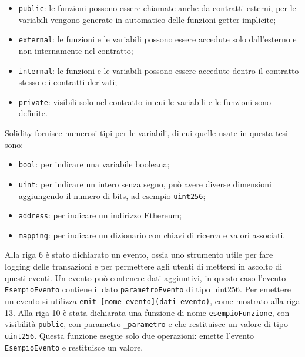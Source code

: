 \documentclass[a4paper]{article}
\begin{document}
      \begin{itemize}
        \item \verb|public|: le funzioni possono essere chiamate anche da contratti esterni, per le variabili vengono generate in automatico delle funzioni getter implicite;
        \item \verb|external|: le funzioni e le variabili possono essere accedute solo dall'esterno e non internamente nel contratto;
        \item \verb|internal|: le funzioni e le variabili possono essere accedute dentro il contratto stesso e i contratti derivati;
        \item \verb|private|: visibili solo nel contratto in cui le variabili e le funzioni sono definite\cite{solidityvisibility}.
      \end{itemize}
      Solidity fornisce numerosi tipi per le variabili, di cui quelle usate in questa tesi sono:
      \begin{itemize}
        \item \verb|bool|: per indicare una variabile booleana;
        \item \verb|uint|: per indicare un intero senza segno, può avere diverse dimensioni aggiungendo il numero di bits, ad esempio \verb|uint256|;
        \item \verb|address|: per indicare un indirizzo Ethereum;
        \item \verb|mapping|: per indicare un dizionario con chiavi di ricerca e valori associati\cite{soliditytypes}.
      \end{itemize}
      Alla riga 6 è stato dichiarato un evento, ossia uno strumento utile per fare logging delle transazioni e per permettere agli utenti di mettersi in ascolto di questi eventi.
      Un evento può contenere dati aggiuntivi, in questo caso l'evento \verb|EsempioEvento| contiene il dato \verb|parametroEvento| di tipo uint256.
      Per emettere un evento si utilizza \verb|emit [nome evento](dati evento)|, come mostrato alla riga 13.
      \newline
      Alla riga 10 è stata dichiarata una funzione di nome \verb|esempioFunzione|, con visibilità \verb|public|, con parametro \verb|_parametro| e che restituisce un valore di tipo \verb|uint256|.
      Questa funzione esegue solo due operazioni: emette l'evento \verb|EsempioEvento| e restituisce un valore. 
\end{document}
